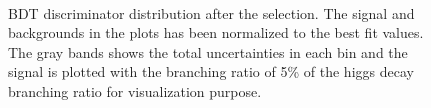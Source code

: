 \begin{figure}[htbp] 
     \centering
     \\
     \caption{BDT discriminator distribution after the selection. The signal and backgrounds in the plots has been normalized to the best fit values. The gray bands shows the total uncertainties in each bin and the signal is plotted with the branching ratio of 5\% of the higgs decay branching ratio for visualization purpose. }
     \label{fig:bdtbasedpostfit}
\end{figure}



